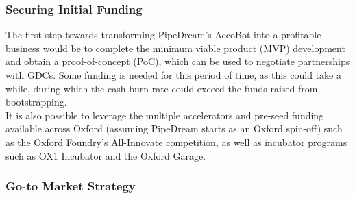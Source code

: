 \documentclass[11pt]{article}		%
\begin{document}
    	\subsubsection{Securing Initial Funding}
    	
    	The first step towards transforming PipeDream’s AccoBot into a profitable business would be to complete the minimum viable product (MVP) development and obtain a proof-of-concept (PoC), which can be used to negotiate partnerships with GDCs. Some funding is needed for this period of time, as this could take a while, during which the cash burn rate could exceed the funds raised from bootstrapping.
    	\\ 
	    \hspace*{2ex}It is also possible to leverage the multiple accelerators and pre-seed funding available across Oxford (assuming PipeDream starts as an Oxford spin-off) such as the Oxford Foundry’s All-Innovate competition, as well as incubator programs such as OX1 Incubator and the Oxford Garage. 
    
    	\subsubsection{Go-to Market Strategy}\label{go-to}
    	
\end{document}
